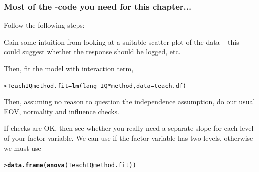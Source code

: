 \documentclass{beamer}\usepackage[]{graphicx}\usepackage[]{xcolor}
\makeatletter
\newcommand{\hlopt}[1]{\textcolor[rgb]{0,0,0}{#1}}%
\newcommand{\hlstd}[1]{\textcolor[rgb]{0.345,0.345,0.345}{#1}}%
\newcommand{\hlkwb}[1]{\textcolor[rgb]{0.69,0.353,0.396}{#1}}%
\newcommand{\hlkwc}[1]{\textcolor[rgb]{0.333,0.667,0.333}{#1}}%
\newcommand{\hlkwd}[1]{\textcolor[rgb]{0.737,0.353,0.396}{\textbf{#1}}}%
\newenvironment{kframe}{%
 \def\at@end@of@kframe{}%
 \ifinner\ifhmode%
  \def\at@end@of@kframe{\end{minipage}}%
  \begin{minipage}{\columnwidth}%
 \fi\fi%
 \def\FrameCommand##1{\hskip\@totalleftmargin \hskip-\fboxsep
 \colorbox{shadecolor}{##1}\hskip-\fboxsep
     \hskip-\linewidth \hskip-\@totalleftmargin \hskip\columnwidth}%
 \MakeFramed {\advance\hsize-\width
   \@totalleftmargin\z@ \linewidth\hsize
   \@setminipage}}%
 {\par\unskip\endMakeFramed%
 \at@end@of@kframe}
\newenvironment{knitrout}{}{} %
\makeatother
\begin{document}
\begin{frame}[fragile]
\frametitle{Most of the -code you need for this chapter...}

Follow the following steps:
\bigskip

Gain some intuition from looking at a suitable scatter plot of the data -- this could suggest whether the response should be logged, etc. 
\bigskip

Then, fit the model with interaction term,
\begin{knitrout}\scriptsize
{}\color{fgcolor}\begin{kframe}
\begin{alltt}
\hlstd{> }\hlstd{TeachIQmethod.fit}\hlkwb{=}\hlkwd{lm}\hlstd{(lang}\hlopt{~}\hlstd{IQ}\hlopt{*}\hlstd{method,} \hlkwc{data}\hlstd{=teach.df)}
\end{alltt}
\end{kframe}
\end{knitrout}

Then, assuming no reason to question the independence assumption,
do our usual EOV, normality and influence checks.
\bigskip

If checks are OK, then see whether you really need a separate slope for each level of your factor variable.
We can use  if the factor variable has two levels, otherwise we must use 

\begin{knitrout}\scriptsize
{}\color{fgcolor}\begin{kframe}
\begin{alltt}
\hlstd{> }\hlkwd{data.frame}\hlstd{(}\hlkwd{anova}\hlstd{(TeachIQmethod.fit))}
\end{alltt}
\end{kframe}
\end{knitrout}


\end{frame}
\end{document}
